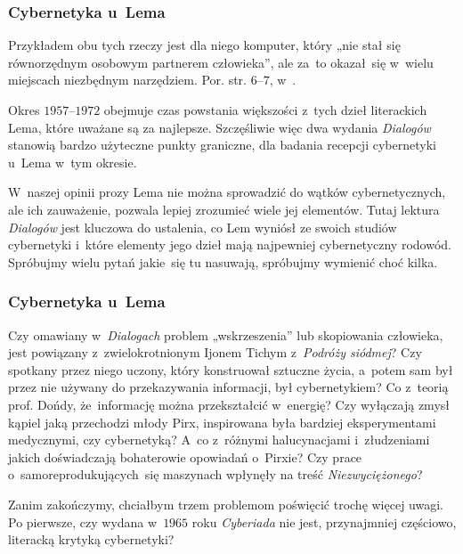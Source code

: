 \documentclass[10pt,t]{beamer}
\begin{document}
\begin{frame}
  \frametitle{Cybernetyka u~Lema}


  Przykładem obu tych rzeczy jest dla niego komputer, który „nie stał się
  równorzędnym osobowym partnerem człowieka”, ale za~to okazał~się w~wielu
  miejscach niezbędnym narzędziem. Por. str. $6\text{--}7$,
  w~\parencite{Lem-Dialogi-Vol-I-Pub-1996}.

  Okres $1957\text{--}1972$ obejmuje czas powstania większości z~tych
  dzieł literackich Lema, które uważane są za najlepsze. Szczęśliwie więc
  dwa wydania \textit{Dialogów} stanowią bardzo użyteczne punkty graniczne,
  dla badania recepcji cybernetyki u~Lema w~tym okresie.

  W~naszej opinii prozy Lema \alert{nie} można sprowadzić do wątków
  cybernetycznych, ale ich zauważenie, pozwala lepiej zrozumieć wiele
  jej elementów. Tutaj lektura \textit{Dialogów} jest kluczowa do ustalenia,
  co Lem wyniósł ze swoich studiów cybernetyki i~które elementy jego
  dzieł mają najpewniej cybernetyczny rodowód. Spróbujmy wielu pytań
  jakie~się tu nasuwają, spróbujmy wymienić choć kilka.

\end{frame}





\begin{frame}
  \frametitle{Cybernetyka u~Lema}


  Czy omawiany w~\textit{Dialogach} problem „wskrzeszenia” lub
  skopiowania człowieka, jest powiązany z~zwielokrotnionym Ijonem Tichym
  z~\textit{Podróży siódmej}? Czy spotkany przez niego uczony, który
  konstruował sztuczne życia, a~potem sam był przez nie używany do
  przekazywania informacji, był cybernetykiem? Co z~teorią prof. Dońdy,
  że~informację można przekształcić w~energię? Czy wyłączają zmysł kąpiel
  jaką przechodzi młody Pirx, inspirowana była bardziej eksperymentami
  medycznymi, czy cybernetyką? A~co z~różnymi halucynacjami i~złudzeniami
  jakich doświadczają bohaterowie opowiadań o~Pirxie? Czy prace
  o~samoreprodukujących~się maszynach wpłynęły na treść
  \textit{Niezwyciężonego}?

  Zanim zakończymy, chciałbym trzem problemom poświęcić trochę więcej uwagi.
  Po pierwsze, czy wydana w~$1965$ roku \textit{Cyberiada} nie jest,
  przynajmniej częściowo, literacką krytyką cybernetyki?

\end{frame}
\end{document}
